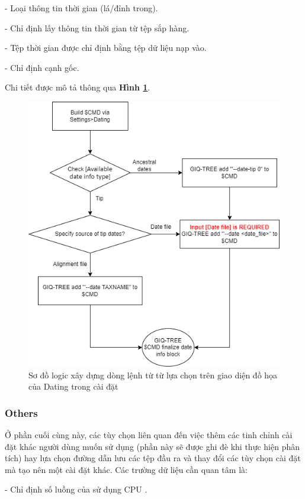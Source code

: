\documentclass[12pt]{report}
\begin{document}
- Loại thông tin thời gian (lá/đỉnh trong).

- Chỉ định lấy thông tin thời gian từ tệp sắp hàng.

- Tệp thời gian được chỉ định bằng tệp dữ liệu nạp vào.

- Chỉ định cạnh gốc.

 Chi tiết được mô tả thông qua  \textbf{Hình \ref{fig:image4.12}}.

\begin{figure}[h]
	\centering
	\includegraphics[scale=0.8]{Image/4.12.png}
	\caption{Sơ đồ logic xây dựng dòng lệnh từ từ lựa chọn trên giao diện đồ họa của Dating trong cài đặt}
	\label{fig:image4.12}
\end{figure}

\subsubsection{Others}
Ở phần cuối cùng này, các tùy chọn liên quan đến việc thêm các tinh chỉnh cài đặt khác người dùng muốn sử dụng (phần này sẽ được ghi đè khi thực hiện phân tích) hay lựa chọn đường dẫn lưu các tệp đầu ra và thay đổi các tùy chọn cài đặt mà tạo nên một cài đặt khác. Các trường dữ liệu cần quan tâm là:

- Chỉ định số luồng của sử dụng CPU .
\end{document}
